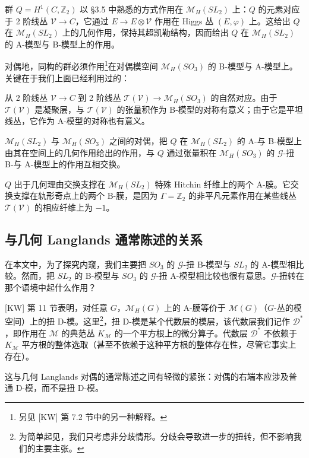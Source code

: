 \documentclass[11pt,a4paper]{article}
\newcommand{\CD}{\mathcal{D}}
\begin{document}
群 $Q=H^1(C,\mathbb{Z}_2)$ 以 §3.5 中熟悉的方式作用在 $\mathcal{M}_H(SL_2)$ 上：$Q$ 的元素对应于 2 阶线丛 $\mathcal{V}\to C$，它通过 $E\to E\otimes\mathcal{V}$ 作用在 Higgs 丛 $(E,\varphi)$ 上。这给出 $Q$ 在 $\mathcal{M}_H(SL_2)$ 上的几何作用，保持其超凯勒结构，因而给出 $Q$ 在 $\mathcal{M}_H(SL_2)$ 的 A-模型与 B-模型上的作用。

对偶地，同构的群必须作用\footnote{另见 [KW] 第 7.2 节中的另一种解释。}在对偶模空间 $\mathcal{M}_H(SO_3)$ 的 B-模型与 A-模型上。关键在于我们上面已经利用过的：


从 2 阶线丛 $\mathcal{V}\to C$ 到 2 阶线丛 $\mathcal{T}(\mathcal{V})\to\mathcal{M}_H(SO_3)$ 的自然对应。由于 $\mathcal{T}(\mathcal{V})$ 是凝聚层，与 $\mathcal{T}(\mathcal{V})$ 的张量积作为 B-模型的对称有意义；由于它是平坦线丛，它作为 A-模型的对称也有意义。

$\mathcal{M}_H(SL_2)$ 与 $\mathcal{M}_H(SO_3)$ 之间的对偶，把 $Q$ 在 $\mathcal{M}_H(SL_2)$ 的 A-与 B-模型上由其在空间上的几何作用给出的作用，与 $Q$ 通过张量积在 $\mathcal{M}_H(SO_3)$ 的 $\mathcal{G}$-扭 B-与 A-模型上的作用互相交换。

$Q$ 出于几何理由交换支撑在 $\mathcal{M}_H(SL_2)$ 特殊 Hitchin 纤维上的两个 A-膜。它交换支撑在轨形奇点上的两个 B-膜，是因为 $\Gamma=\mathbb{Z}_2$ 的非平凡元素作用在某些线丛 $\mathcal{T}(\mathcal{V})$ 的相应纤维上为 $-1$。

\subsection{与几何 Langlands 通常陈述的关系}

在本文中，为了探究内窥，我们主要把 $SO_3$ 的 $\mathcal{G}$-扭 B-模型与 $SL_2$ 的 A-模型相比较。然而，把 $SL_2$ 的 B-模型与 $SO_3$ 的 $\mathcal{G}$-扭 A-模型相比较也很有意思。$\mathcal{G}$-扭转在那个语境中起什么作用？

[KW] 第 11 节表明，对任意 $G$，$\mathcal{M}_H(G)$ 上的 A-膜等价于 $\mathcal{M}(G)$（$G$-丛的模空间）上的扭 D-模。这里\footnote{为简单起见，我们只考虑非分歧情形。分歧会导致进一步的扭转，但不影响我们的主要主张。}，扭 D-模是某个代数层的模层，该代数层我们记作 $\CD^*$，即作用在 $\mathcal{M}$ 的典范丛 $K_{\mathcal{M}}$ 的一个平方根上的微分算子。代数层 $\CD^*$ 不依赖于 $K_{\mathcal{M}}$ 平方根的整体选取（甚至不依赖于这种平方根的整体存在性，尽管它事实上存在）。

这与几何 Langlands 对偶的通常陈述之间有轻微的紧张：对偶的右端本应涉及普通 D-模，而不是扭 D-模。
\end{document}

